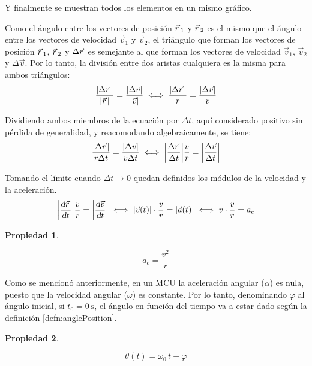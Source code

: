\documentclass[a5paper,12pt,twoside]{book}
\newtheorem{prop}{{Propiedad}}[chapter]
\begin{document}
Y finalmente se muestran todos los elementos en un mismo gráfico.

\begin{center}
    \def\svgwidth{0.8\linewidth}
    
\end{center}

Como el ángulo entre los vectores de posición $\vec{r}\hspace{0.05cm}_1$ y $\vec{r}\hspace{0.05cm}_2$ es el mismo que el ángulo entre los vectores de velocidad $\Vec{v}_1$ y $\Vec{v}_2$, el triángulo que forman los vectores de posición $\vec{r}\hspace{0.05cm}_1$, $\vec{r}\hspace{0.05cm}_2$ y $\Delta \vec{r}\hspace{0.05cm}$ es semejante al que forman los vectores de velocidad $\Vec{v}_1$, $\Vec{v}_2$ y $\Delta \Vec{v}$. Por lo tanto, la división entre dos aristas cualquiera es la misma para ambos triángulos:
\[
  \dfrac{{\left| {\Delta\vec{r}\hspace{0.05cm}} \right|}}{{\left| {\vec{r}\hspace{0.05cm}} \right|}} = \dfrac{{\left| {\Delta\Vec{v}} \right|}}{{\left| {\Vec{v}} \right|}}
  \iff
  \dfrac{{\left| {\Delta\vec{r}\hspace{0.05cm}} \right|}}{r} = \dfrac{{\left| {\Delta\Vec{v}} \right|}}{v}
\]

Dividiendo ambos miembros de la ecuación por $\Delta t$, aquí considerado positivo sin pérdida de generalidad, y reacomodando algebraicamente, se tiene:
\[
  \dfrac{{\left| {\Delta\vec{r}\hspace{0.05cm}} \right|}}{r \Delta t} = \dfrac{{\left| {\Delta \Vec{v}} \right|}}{v \Delta t}
  \iff
  {\left| {\dfrac{\Delta \vec{r}\hspace{0.05cm}}{\Delta t}} \right|} \dfrac{v}{r} = {\left| {\dfrac{\Delta \Vec{v}}{\Delta t}} \right|}
\]

Tomando el límite cuando $\Delta t \to 0$ quedan definidos los módulos de la velocidad y la aceleración.
\[
  {\left| {\dfrac{\textsl{d} \vec{r}\hspace{0.05cm}}{\textsl{d} t}} \right|} \dfrac{v}{r} = {\left| {\dfrac{\textsl{d} \Vec{v}}{\textsl{d} t}} \right|}
  \iff
  {\left| {\Vec{v}(t)} \right|} \cdot \dfrac{v}{r} = {\left| {\Vec{a}(t)} \right|}
  \iff
  v \cdot \dfrac{v}{r} = a_c
\]

\begin{mdframed}[style=MyFrame1]
    \begin{prop}
        \label{prop:}
    \end{prop}
    \begin{equation*}
        a_c = \dfrac{v^2}{r}
    \end{equation*}
\end{mdframed}

Como se mencionó anteriormente, en un MCU la aceleración angular ($\alpha$) es nula, puesto que la velocidad angular ($\omega$) es constante. Por lo tanto, denominando $\varphi$ al ángulo inicial, si $t_0=\SI{0}{\second}$, el ángulo en función del tiempo va a estar dado según la definición \ref{defn:anglePosition}.

\begin{mdframed}[style=MyFrame1]
    \begin{prop}
    \end{prop}
    \begin{equation*}
        \theta (t) = \omega_0 \, t + \varphi
    \end{equation*}
\end{mdframed}
\end{document}
